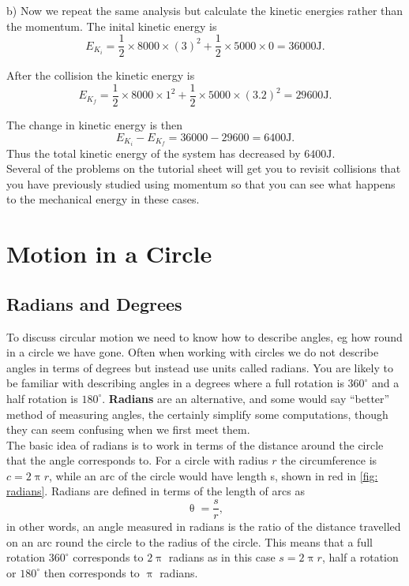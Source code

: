 \documentclass[a4paper,12pt]{book}
\begin{document}
b) Now we repeat the same analysis but calculate the kinetic energies rather than the momentum. The inital kinetic energy is
\begin{equation*}
E_{K_{i}}=\frac{1}{2}\times 8000\times(3)^2 +\frac{1}{2}\times 5000\times 0=36000\text{J}.
\end{equation*}

After the collision the kinetic energy is
\begin{equation*}
E_{K_{f}}=\frac{1}{2}\times 8000\times 1^{2}+\frac{1}{2}\times 5000\times (3.2)^{2}=29 600\text{J}.
\end{equation*}

The change in kinetic energy is then
\begin{equation*}
E_{K_{i}}-E_{K_{f}}=36000-29600=6400\text{J}.
\end{equation*}
Thus the total kinetic energy of the system has decreased by $6400\text{J}$.\\


Several of the problems on the tutorial sheet will get you to revisit collisions that you have previously studied using momentum so that you can see what happens to the mechanical energy in these cases.



\chapter{Motion in a Circle}
\section{Radians and Degrees}
To discuss circular motion we need to know how to describe angles, eg how round in a circle we have gone. Often when working with circles we do not describe angles in terms of degrees but instead use units called radians.  You are likely to be familiar with describing angles in a degrees where a full rotation is $360^{\circ}$ and a half rotation is $180^{\circ}$. \textbf{Radians} are an alternative, and some would say ``better'' method of measuring angles, the certainly simplify some computations, though they can seem confusing when we first meet them.\\

The basic idea of radians is to work in terms of the distance around the circle that the angle corresponds to.  For a circle with radius $r$ the circumference is $c=2\uppi r$, while an arc of the circle would have length s, shown in red in \cref{fig: radians}. Radians are defined in terms of the length of arcs as
\begin{equation}
\uptheta =\frac{s}{r},
\label{eq: definition of radians}
\end{equation}
in other words, an angle measured in radians is the ratio of the distance travelled on an arc round the circle to the radius of the circle. 
This means that a full rotation $360^{\circ}$ corresponds to $2\uppi$ radians as in this case $s=2\uppi r$, half a rotation or $180^{\circ}$ then corresponds to $\uppi$ radians. 
\end{document}
